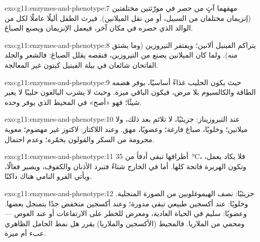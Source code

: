 \begin{solution}{exo:g11:enzymes-and-phenotype:7}
مهقهما آتٍ من حصر في مورّثتين مختلفتين (إنزيمان مختلفان من السبيل، أو
من نقل الميلانين). فيرث الطفل أليلًا عاملًا لكل  من الوالد الذي
حصره في مكان آخر، فيعمل الإنزيمان ويصنع الصباغ.
\end{solution}

\begin{solution}{exo:g11:enzymes-and-phenotype:8}
يتراكم الفينيل ألانين؛ ويفتقر التيروزين (وما يشتق منه). ولما كان
الميلانين يصنع من التيروزين، فنقصه يقلل الصباغ: فالشعر والجلد الفاتحان
شائعان في بيلة الفينيل كيتون غير المعالجة.
\end{solution}

\begin{solution}{exo:g11:enzymes-and-phenotype:9}
حيث يكون الحليب غذاءً أساسيًا، يوفر هضمه الطاقة والكالسيوم بلا مرض،
فيكون  الباقي ميزة. وحيث لا يشرب البالغون حليبًا لا يغير 
شيئًا؛ فهو «أصح» في المحيط الذي يوفر  وحده.
\end{solution}

\begin{solution}{exo:g11:enzymes-and-phenotype:10}
عند التيروزيناز: جزيئيًا، لا تلائم  بعد ذلك، ولا ميلانين؛
وخلويًا،  صباغ فارغة؛ وعضويًا، مهق. وعند اللاكتاز: لاكتوز غير
مهضوم؛  معوية محرومة من السكر والقولون يخمّره؛ وعدم احتمال.
\end{solution}

\begin{solution}{exo:g11:enzymes-and-phenotype:11}
أطرافها تبقى أدفأ من \qty{35}{\celsius}، فلا يكاد  يعمل، وتكون
الهريرة فاتحة كلها. أما في الخارج شتاءً فتبرد الأذنان والكفوف، ويصير
 فعالًا، ويأتي الفرو النامي هناك داكنًا.
\end{solution}

\begin{solution}{exo:g11:enzymes-and-phenotype:12}
جزيئيًا: نصف الهيموغلوبين من الصورة المنجلية. وخلويًا: عند أكسجين
طبيعي تبقى  مدورة؛ وعند أكسجين منخفض جدًا يتمنجل بعضها.
وعضويًا: سليم في الحياة العادية، ومعرض للخطر على الارتفاعات أو عند
الغوص --- ومحمي من الملاريا. فالمحيط (الأكسجين والملاريا) يقرر هل نمط
الحامل الظاهري عبء أم ميزة.
\end{solution}

